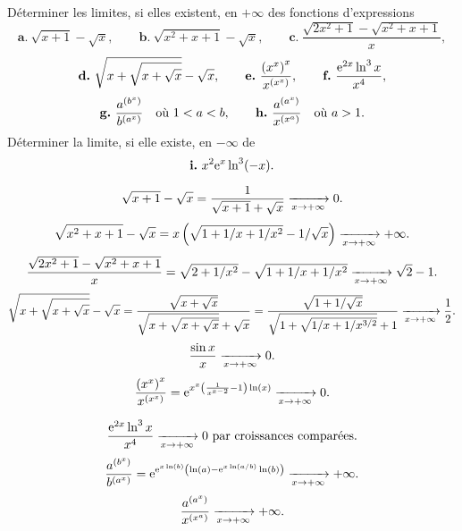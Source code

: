 \documentclass{magnolia}
\begin{document}

Déterminer les limites, si elles existent, en $+\infty$ des fonctions
d'expressions
\[\textbf{a.}\ \sqrt{x+1}-\sqrt{x}, \qquad \textbf{b.}\ \sqrt{x^2+x+1}-\sqrt{x}, \qquad
\textbf{c.}\ \frac{\sqrt{2x^2+1}-\sqrt{x^2+x+1}}{x},\]
\[\textbf{d.}\ \sqrt{x+\sqrt{x+\sqrt{x}}}-\sqrt{x}, \qquad
\textbf{e.}\ \frac{\p{x^x}^x}{x^{\p{x^x}}}, \qquad \textbf{f.}\ \frac{\e^{2x} \ln^3 x}{x^4},\]
\[\textbf{g.}\ \frac{a^{\left(b^x\right)}}{b^{\left(a^x\right)}} \quad \text{où $1<a<b$}, \qquad
\textbf{h.}\ \frac{a^{\left(a^x\right)}}{x^{\left(x^a\right)}} \quad \text{où $a>1$}.\]
Déterminer la limite, si elle existe, en $-\infty$ de 
\[\textbf{i.}\ x^2 {\rm e}^{x} \ln^3(-x).\]

\begin{sol}
$$\sqrt{x+1}-\sqrt{x}=\dfrac{1}{\sqrt{x+1}+\sqrt{x}}\xrightarrow[x\rightarrow +\infty]{}{0}.$$
$$\sqrt{x^2+x+1}-\sqrt{x}=x\left(\sqrt{1+1/x+1/x^2}-1/\sqrt{x}\right)\xrightarrow[x\rightarrow +\infty]{}{+\infty}.$$
$$\frac{\sqrt{2x^2+1}-\sqrt{x^2+x+1}}{x}=\sqrt{2+1/x^2}-\sqrt{1+1/x+1/x^2}\xrightarrow[x\rightarrow +\infty]{}{\sqrt{2}-1}.$$
$$\sqrt{x+\sqrt{x+\sqrt{x}}}-\sqrt{x}=\dfrac{\sqrt{x+\sqrt{x}}}{\sqrt{x+\sqrt{x+\sqrt{x}}}+\sqrt{x}}=\dfrac{\sqrt{1+1/\sqrt{x}}}{\sqrt{1+\sqrt{1/x+1/x^{3/2}}}+1}\xrightarrow[x\rightarrow +\infty]{}{\frac{1}{2}}.$$
$$\frac{\sin x}{x}\xrightarrow[x\rightarrow +\infty]{}{0}.$$
$$\frac{\left(x^x\right)^x}{x^{\left(x^x\right)}}={\rm e}^{x^x\left(\frac{1}{x^{x-2}}-1\right)\ln(x)}\xrightarrow[x\rightarrow +\infty]{}{0}.$$

$$\frac{{\rm e}^{2x} \ln^3 x}{x^4}\xrightarrow[x\rightarrow +\infty]{}{0} \text{ par croissances comparées}.$$
$$\frac{a^{\left(b^x\right)}}{b^{\left(a^x\right)}}={\rm e}^{{\rm e}^{x\ln(b)}\left(\ln(a)-{\rm e}^{x\ln(a/b)}\ln(b)\right)}\xrightarrow[x\rightarrow +\infty]{}{+\infty}.$$ 
$$\frac{a^{\left(a^x\right)}}{x^{\left(x^a\right)}}\xrightarrow[x\rightarrow +\infty]{}{+\infty}.$$
\end{sol}
\end{document}
